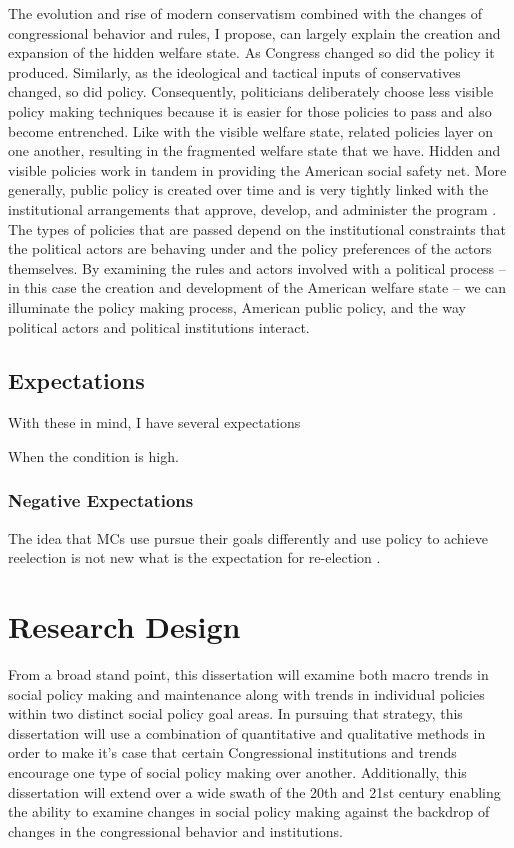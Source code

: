 \documentclass[12pt]{article}
\begin{document}
The evolution and rise of modern conservatism combined with the changes of congressional behavior and rules, I propose, can largely explain the creation and expansion of the hidden welfare state. As Congress changed so did the policy it produced. Similarly, as the ideological and tactical inputs of conservatives changed, so did policy. Consequently, politicians deliberately choose less visible policy making techniques because it is easier for those policies to pass and also become entrenched. Like with the visible welfare state, related policies layer on one another, resulting in the fragmented welfare state that we have. Hidden and visible policies work in tandem in providing the American social safety net. More generally, public policy is created over time and is very tightly linked with the institutional arrangements that approve, develop, and administer the program \citep{pierson2004b}. The types of policies that are passed depend on the institutional constraints that the political actors are behaving under and the policy preferences of the actors themselves. By examining the rules and actors involved with a political process -- in this case the creation and development of the American welfare state -- we can illuminate the policy making process, American public policy, and the way political actors and political institutions interact.

\subsection{Expectations}

With these in mind, I have several expectations  

When the condition is high.


\subsubsection{Negative Expectations}
The idea that MCs use pursue their goals differently and use policy to achieve reelection is not new what is the expectation for re-election \citep{fenno1973, kernell1999}.


\section{Research Design}

From a broad stand point, this dissertation will examine both macro trends in social policy making and maintenance along with trends in individual policies within two distinct social policy goal areas. In pursuing that strategy, this dissertation will use a combination of quantitative and qualitative methods in order to make it's case that certain Congressional institutions and trends encourage one type of social policy making over another. Additionally, this dissertation will extend over a wide swath of the 20th and 21st century enabling the ability to examine changes in social policy making against the backdrop of changes in the congressional behavior and institutions.
\end{document}

